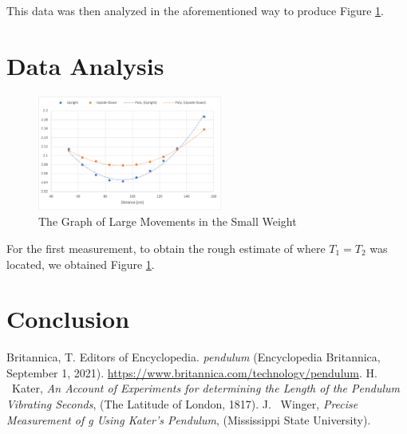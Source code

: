 \documentclass[aps,prl,10pt,twocolumn,floatfix]{revtex4-2}
\begin{document}
This data was then analyzed in the aforementioned way to produce Figure \ref{1stGraph}.


\section{Data Analysis}
\begin{figure}
\includegraphics[width=230px]{FirstMeasurement.png}
\caption{The Graph of Large Movements in the Small Weight}
\label{1stGraph}
\end{figure}

For the first measurement, to obtain the rough estimate of where $T_1=T_2$ was located, we obtained Figure \ref{1stGraph}. 

\section{Conclusion}


\begin{thebibliography}{9}
 Britannica, T. Editors of Encyclopedia. \textit{pendulum} (Encyclopedia Britannica, September 1, 2021). \url{https://www.britannica.com/technology/pendulum}.
 H. ~Kater, \textit{An Account of Experiments for determining the Length of the Pendulum Vibrating Seconds}, (The Latitude of London, 1817).
 J. ~Winger, \textit{Precise Measurement of g Using Kater’s Pendulum}, (Mississippi State University).
\end{thebibliography}
\end{document}
